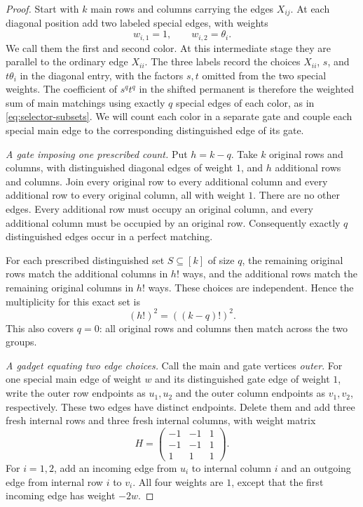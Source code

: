 \begin{proof}
Start with $k$ main rows and columns carrying the edges $X_{ij}$.
At each diagonal position add two labeled special edges, with weights
\[
 w_{i,1}=1,\qquad w_{i,2}=\theta_i.
\]
We call them the first and second color.  At this intermediate stage
they are parallel to the ordinary edge $X_{ii}$.  The three labels record
the choices $X_{ii}$, $s$, and $t\theta_i$ in the diagonal entry, with the
factors $s,t$ omitted from the two special weights.  The coefficient of
$s^qt^q$ in the shifted permanent is therefore the weighted sum of main
matchings using exactly $q$ special edges of each color, as in
\eqref{eq:selector-subsets}.
We will count each color in a separate gate and couple each special
main edge to the corresponding distinguished edge of its gate.

\emph{A gate imposing one prescribed count.}
Put $h=k-q$.  Take $k$ original rows and columns, with distinguished
diagonal edges of weight $1$, and $h$ additional rows and columns.
Join every original row to every additional column and every additional
row to every original column, all with weight $1$.  There are no other
edges.  Every additional row must occupy an original column, and every
additional column must be occupied by an original row.  Consequently
exactly $q$ distinguished edges occur in a perfect matching.

For each prescribed distinguished set $S\subseteq[k]$ of size $q$, the
remaining original rows match the additional columns in $h!$ ways, and
the additional rows match the remaining original columns in $h!$ ways.
These choices are independent.  Hence the multiplicity for this exact
set is
\begin{equation}
 (h!)^2=((k-q)!)^2.
 \label{eq:selector-gate-count}
\end{equation}
This also covers $q=0$: all original rows and columns then match across
the two groups.

\emph{A gadget equating two edge choices.}
Call the main and gate vertices \emph{outer}.  For one special main edge
of weight $w$ and its distinguished gate edge
of weight $1$, write the outer row endpoints as $u_1,u_2$ and the outer
column endpoints as $v_1,v_2$, respectively.  These two edges have distinct
endpoints.  Delete them and add three fresh internal rows and three fresh
internal columns, with weight matrix
\begin{equation}
 H=\begin{pmatrix}-1&-1&1\\-1&-1&1\\1&1&1\end{pmatrix}.
 \label{eq:selector-gadget}
\end{equation}
For $i=1,2$, add an incoming edge from $u_i$ to internal column $i$ and
an outgoing edge from internal row $i$ to $v_i$.  All four weights are
$1$, except that the first incoming edge has weight $-2w$.


\end{proof}
